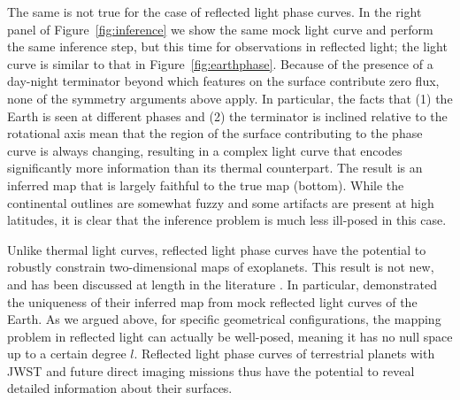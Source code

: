 \documentclass[modern]{aastex62}
\begin{document}
The same is not true for the case of reflected light phase curves. In
the right panel of Figure~\ref{fig:inference} we show the same
mock light curve and perform the same inference step,
but this time for observations in reflected light; the light curve
is similar to that in Figure~\ref{fig:earthphase}. Because of the
presence of a day-night terminator beyond which features on the surface
contribute zero flux, none of the symmetry arguments above apply. In
particular, the facts that (1) the Earth is seen at different phases and
(2) the terminator is inclined relative to the rotational axis mean
that the region of the surface contributing to the phase curve is
always changing, resulting in a complex light curve that encodes
significantly more information than its thermal counterpart.
%
The result is an inferred map that is largely faithful to the
true map (bottom). While the continental outlines are somewhat fuzzy and some
artifacts are present at high latitudes, it is clear that the
inference problem is much less ill-posed in this case.

Unlike thermal light curves, reflected light phase curves have the
potential to robustly constrain two-dimensional maps of exoplanets.
This result is
not new, and has been discussed at length in the literature
\citep[e.g.,][]{Fujii2012,Berdyugina2017,Luger2019b,Aizawa2020,Kawahara2020}.
In particular, \citet{Kawahara2010} demonstrated the uniqueness of their
inferred map from mock reflected light curves of the Earth. As we argued
above, for specific geometrical configurations, the mapping problem
in reflected light can actually be well-posed, meaning it has no
null space up to a certain degree $l$. Reflected light phase curves of
terrestrial planets with JWST and future direct imaging missions thus
have the potential to reveal detailed information about their surfaces.
\end{document}
